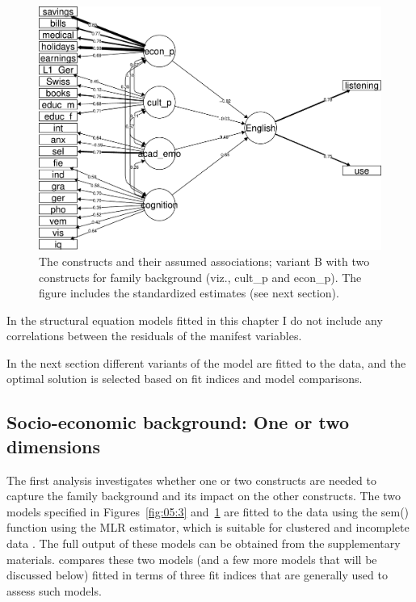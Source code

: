 \documentclass[output=paper]{langsci/langscibook}
\begin{document}
\begin{figure}
\includegraphics[width=\textwidth]{figures/Figure5.4.pdf}
\caption{The constructs and their assumed associations; variant B with two constructs for family background (viz., cult\_p and econ\_p). The figure includes the standardized estimates (see next section).\label{fig:05:4}}
\end{figure}

In the structural equation models fitted in this chapter I do not include any correlations between the residuals of the manifest variables.

In the next section different variants of the model are fitted to the data, and the optimal solution is selected based on fit indices and model comparisons.

\subsection{Socio-economic background: One or two dimensions}

The first analysis investigates whether one or two constructs are needed to capture the family background and its impact on the other constructs. The two models specified in Figures~\ref{fig:05:3} and~\ref{fig:05:4} are fitted to the data using the sem() function using the MLR estimator, which is suitable for clustered and incomplete data \citep{Rosseel2012}. The full output of these models can be obtained from the supplementary materials.  compares these two models (and a few more models that will be discussed below) fitted in terms of three fit indices that are generally used to assess such models.
\end{document}
